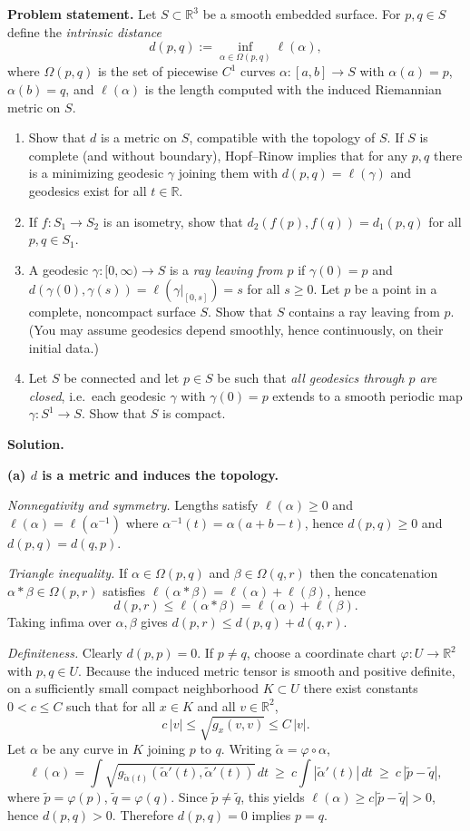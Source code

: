 \documentclass[12pt,a4paper]{article}
\theoremstyle{plain}
\theoremstyle{definition}      %
\begin{document}
	\textbf{Problem statement.}
	Let $S\subset\mathbb R^3$ be a smooth embedded surface. For $p,q\in S$ define the \emph{intrinsic distance}
	\[
	d(p,q):=\inf_{\alpha\in\Omega(p,q)} \ell(\alpha),
	\]
	where $\Omega(p,q)$ is the set of piecewise $C^1$ curves $\alpha:[a,b]\to S$ with $\alpha(a)=p$, $\alpha(b)=q$, and
	$\ell(\alpha)$ is the length computed with the induced Riemannian metric on $S$.
	\begin{enumerate}
		\item Show that $d$ is a metric on $S$, compatible with the topology of $S$.
		If $S$ is complete (and without boundary), Hopf--Rinow implies that for any $p,q$ there is a minimizing geodesic
		$\gamma$ joining them with $d(p,q)=\ell(\gamma)$ and geodesics exist for all $t\in\mathbb R$.
		\item[(i)] If $f:S_1\to S_2$ is an isometry, show that $d_2(f(p),f(q))=d_1(p,q)$ for all $p,q\in S_1$.
		\item[(ii)] A geodesic $\gamma:[0,\infty)\to S$ is a \emph{ray leaving from $p$} if $\gamma(0)=p$ and
		$d(\gamma(0),\gamma(s))=\ell(\gamma|_{[0,s]})=s$ for all $s\ge 0$. Let $p$ be a point in a complete, noncompact surface $S$.
		Show that $S$ contains a ray leaving from $p$. (You may assume geodesics depend smoothly, hence continuously, on their initial data.)
		\item[(iii)] Let $S$ be connected and let $p\in S$ be such that \emph{all geodesics through $p$ are closed}, i.e.\ each geodesic
		$\gamma$ with $\gamma(0)=p$ extends to a smooth periodic map $\gamma:S^1\to S$. Show that $S$ is compact.
	\end{enumerate}
	
	\medskip
	\textbf{Solution.}
	
	\smallskip
	\textbf{(a) $d$ is a metric and induces the topology.}
	
	\emph{Nonnegativity and symmetry.}
	Lengths satisfy $\ell(\alpha)\ge 0$ and $\ell(\alpha)=\ell(\alpha^{-1})$ where $\alpha^{-1}(t)=\alpha(a+b-t)$, hence
	$d(p,q)\ge 0$ and $d(p,q)=d(q,p)$.
	
	\emph{Triangle inequality.}
	If $\alpha\in\Omega(p,q)$ and $\beta\in\Omega(q,r)$ then the concatenation $\alpha*\beta\in\Omega(p,r)$ satisfies
	$\ell(\alpha*\beta)=\ell(\alpha)+\ell(\beta)$, hence
	\[
	d(p,r)\le \ell(\alpha*\beta)=\ell(\alpha)+\ell(\beta).
	\]
	Taking infima over $\alpha,\beta$ gives $d(p,r)\le d(p,q)+d(q,r)$.
	
	\emph{Definiteness.}
	Clearly $d(p,p)=0$. If $p\neq q$, choose a coordinate chart $\varphi:U\to\mathbb R^2$ with $p,q\in U$.
	Because the induced metric tensor is smooth and positive definite, on a sufficiently small compact neighborhood $K\subset U$
	there exist constants $0<c\le C$ such that for all $x\in K$ and all $v\in\mathbb R^2$,
	\[
	c\,|v| \le \sqrt{g_x(v,v)} \le C\,|v|.
	\]
	Let $\alpha$ be any curve in $K$ joining $p$ to $q$. Writing $\tilde\alpha=\varphi\circ\alpha$,
	\[
	\ell(\alpha)=\int \sqrt{g_{\tilde\alpha(t)}(\tilde\alpha'(t),\tilde\alpha'(t))}\,dt
	\ \ge\ c\int |\tilde\alpha'(t)|\,dt \ \ge\ c\,|\tilde p-\tilde q|,
	\]
	where $\tilde p=\varphi(p)$, $\tilde q=\varphi(q)$. Since $\tilde p\neq\tilde q$, this yields $\ell(\alpha)\ge c|\tilde p-\tilde q|>0$,
	hence $d(p,q)>0$. Therefore $d(p,q)=0$ implies $p=q$.
	
\end{document}
